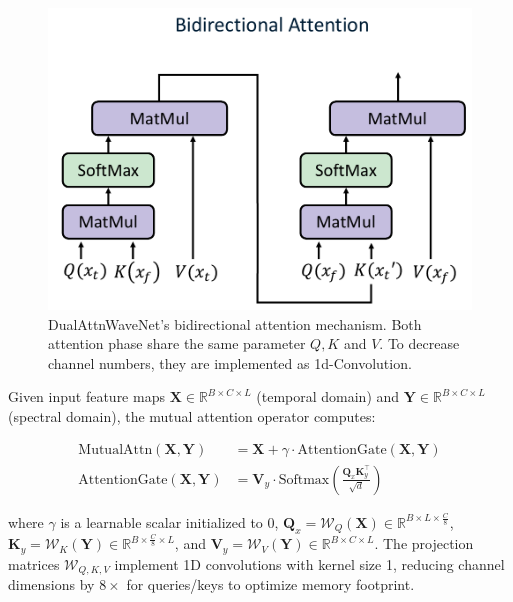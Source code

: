 \documentclass[10pt, conference]{IEEEtran}
\begin{document}
\begin{figure}[tb]
    \centering
    \includegraphics[width=0.9\linewidth]{bidirectional-attention.pdf}
    \caption{DualAttnWaveNet's bidirectional attention mechanism. Both attention phase share the same parameter $Q, K$ and $V$. To decrease channel numbers, they are implemented as 1d-Convolution.}
    \label{fig:bidirectional-attention}
\end{figure}

Given input feature maps $\mathbf{X} \in \mathbb{R}^{B \times C \times L}$ (temporal domain) and $\mathbf{Y} \in \mathbb{R}^{B \times C \times L}$ (spectral domain), the mutual attention operator computes:

\begin{equation}
    \begin{aligned}
        \text{MutualAttn}(\mathbf{X}, \mathbf{Y})    & = \mathbf{X} + \gamma \cdot \text{AttentionGate}(\mathbf{X}, \mathbf{Y})                        \\
        \text{AttentionGate}(\mathbf{X}, \mathbf{Y}) & = \mathbf{V}_y \cdot \text{Softmax}\left(\frac{\mathbf{Q}_x \mathbf{K}_y^\top}{\sqrt{d}}\right)
    \end{aligned}
\end{equation}

where $\gamma$ is a learnable scalar initialized to 0, $\mathbf{Q}_x = \mathcal{W}_Q(\mathbf{X}) \in \mathbb{R}^{B \times L \times \frac{C}{8}}$, $\mathbf{K}_y = \mathcal{W}_K(\mathbf{Y}) \in \mathbb{R}^{B \times \frac{C}{8} \times L}$, and $\mathbf{V}_y = \mathcal{W}_V(\mathbf{Y}) \in \mathbb{R}^{B \times C \times L}$. The projection matrices $\mathcal{W}_{Q,K,V}$ implement 1D convolutions with kernel size 1, reducing channel dimensions by $8\times$ for queries/keys to optimize memory footprint.
\end{document}
